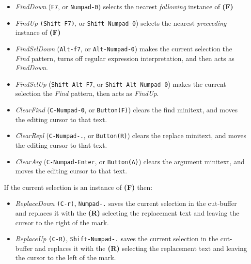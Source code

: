 \documentclass[11pt,a4paper]{article}
\begin{document}
\begin{itemize}
\item
  \emph{FindDown} (\texttt{F7}, or \texttt{Numpad-0}) selects the
  nearest \emph{following} instance of \textbf{(F)}
\item
  \emph{FindUp} \texttt{(Shift-F7)}, or \texttt{Shift-Numpad-0}) selects the
  nearest \emph{preceeding} instance of \textbf{(F)}
\item
  \emph{FindSelDown} (\texttt{Alt-f7}, or \texttt{Alt-Numpad-0}) makes
  the current selection the \emph{Find} pattern, turns off regular
  expression interpretation, and then acts as \emph{FindDown}.
\item
  \emph{FindSelUp} (\texttt{Shift-Alt-F7}, or \texttt{Shift-Alt-Numpad-0})
  makes the current selection the \emph{Find} pattern, then acts as
  \emph{FindUp}.
\item
  \emph{ClearFind} (\texttt{C-Numpad-0}, or \texttt{Button(F)}) clears
  the find minitext, and moves the editing cursor to that text.
\item
  \emph{ClearRepl} (\texttt{C-Numpad-.}, or \texttt{Button(R)}) clears
  the replace minitext, and moves the editing cursor to that text.
\item
  \emph{ClearArg} (\texttt{C-Numpad-Enter}, or \texttt{Button(A)})
  clears the argument minitext, and moves the editing cursor to that
  text.
\end{itemize}

If the current selection is an instance of \textbf{(F)} then:

\begin{itemize}
\item
  \emph{ReplaceDown} \texttt{(C-r)}, \texttt{Numpad-.} saves the current
  selection in the cut-buffer and replaces it with the \textbf{(R)}
  selecting the replacement text and leaving the cursor to the right of
  the mark.
\item
  \emph{ReplaceUp} \texttt{(C-R)}, \texttt{Shift-Numpad-.} saves the
  current selection in the cut-buffer and replaces it with the
  \textbf{(R)} selecting the replacement text and leaving the cursor to
  the left of the mark.
\end{itemize}
\end{document}
